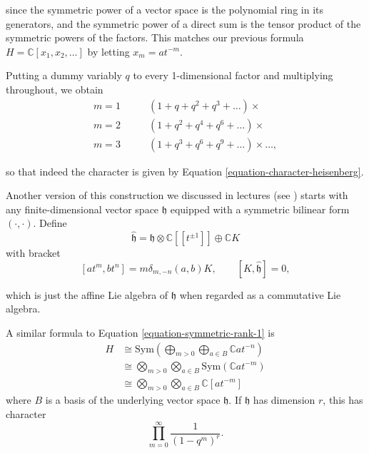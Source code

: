 \noindent
since the symmetric power of a vector space
is the polynomial ring in its generators,
and the symmetric power of a direct sum
is the tensor product of the symmetric powers of the factors.
This matches our previous formula
$H=\mathbb{C}[x_1,x_2,\ldots]$ by letting $x_m=at^{-m}$.

Putting a dummy variably $q$ to every 1-dimensional
factor and multiplying throughout, we obtain
\begin{align*}
m=1\qquad &(1+q+q^2+q^3+\ldots)\times\\
m=2\qquad &(1+q^2+q^4+q^6+\ldots)\times\\
m=3\qquad &(1+q^3+q^6+q^9+\ldots)\times\ldots,
\end{align*}

\noindent
so that indeed the character is given by 
Equation \ref{equation-character-heisenberg}.

\medskip\noindent
Another version of this construction
we discussed in lectures
(see \cite[Section 3.1]{Jethro-vertex-algebras})
starts with any finite-dimensional vector space $\mathfrak{h}$
equipped with a symmetric bilinear form $(\cdot,\cdot)$.
Define
$$
\hat{\mathfrak{h}}=\mathfrak{h}\otimes\mathbb{C}[[t^{\pm 1}]]\oplus\mathbb{C}K
$$
with bracket
\begin{equation}
\label{equation-bracket-affine}
[at^m,bt^n]=m\delta_{m,-n}(a,b)K,\qquad [K,\hat{\mathfrak{h}}]=0,
\end{equation}

\noindent
which is just the affine Lie algebra of $\mathfrak{h}$ when
regarded as a commutative Lie algebra.

A similar formula to Equation \ref{equation-symmetric-rank-1} is
\begin{equation}
\label{equation-symmetric}
\begin{aligned}
H&\cong\text{Sym}\left(\bigoplus_{m>0}\bigoplus_{a \in B}
\mathbb{C}at^{-n}\right)\\
&\cong\bigotimes_{m>0}\bigotimes_{a \in B}\text{Sym}(\mathbb{C}at^{-m})\\
&\cong\bigotimes_{m>0}\bigotimes_{a \in B}\mathbb{C}[at^{-m}]
\end{aligned}
\end{equation}
where $B$ is a basis of the underlying vector space $\mathfrak{h}$.
If $\mathfrak{h}$ has dimension $r$, this has character
\begin{equation}
\label{equation-character-rank-r}
\prod_{m=0}^\infty\frac{1}{(1-q^m)^r}.
\end{equation}

